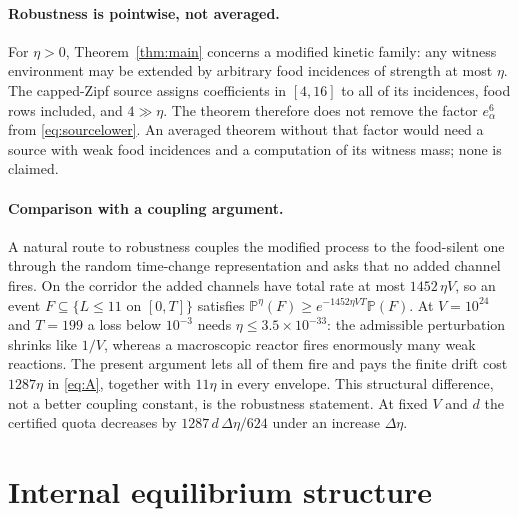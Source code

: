 \documentclass[11pt,letterpaper]{article}
\theoremstyle{plain}
\theoremstyle{definition}
\theoremstyle{remark}
\numberwithin{equation}{section}
\newcommand{\PP}{\mathbb P}
\begin{document}
\paragraph{Robustness is pointwise, not averaged.}
For $\eta>0$, Theorem~\ref{thm:main} concerns a modified kinetic family: any witness environment may be extended by arbitrary food incidences of strength at most $\eta$. The capped-Zipf source assigns coefficients in $[4,16]$ to all of its incidences, food rows included, and $4\gg\eta$. The theorem therefore does not remove the factor $e_\alpha^6$ from \eqref{eq:sourcelower}. An averaged theorem without that factor would need a source with weak food incidences and a computation of its witness mass; none is claimed.

\paragraph{Comparison with a coupling argument.}
A natural route to robustness couples the modified process to the food-silent one through the random time-change representation \cite{anderson2011continuous,ethier1986markov} and asks that no added channel fires. On the corridor the added channels have total rate at most $1452\,\eta V$, so an event $F\subseteq\{L\le11\text{ on }[0,T]\}$ satisfies $\PP^\eta(F)\ge e^{-1452\eta VT}\PP(F)$. At $V=10^{24}$ and $T=199$ a loss below $10^{-3}$ needs $\eta\le3.5\times10^{-33}$: the admissible perturbation shrinks like $1/V$, whereas a macroscopic reactor fires enormously many weak reactions. The present argument lets all of them fire and pays the finite drift cost $1287\eta$ in \eqref{eq:A}, together with $11\eta$ in every envelope. This structural difference, not a better coupling constant, is the robustness statement. At fixed $V$ and $d$ the certified quota decreases by $1287\,d\,\Delta\eta/624$ under an increase $\Delta\eta$.

\section{Internal equilibrium structure}\label{sec:db}
\end{document}
